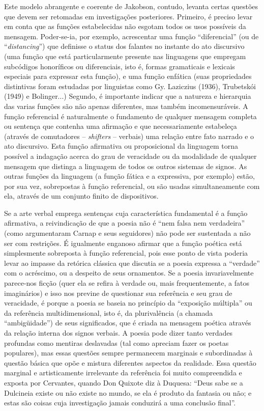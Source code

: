 Este modelo abrangente e coerente de Jakobson, contudo, levanta certas
questões que devem ser retomadas em investigações posteriores. Primeiro,
é preciso levar em conta que as funções estabelecidas não esgotam todos
os usos possíveis da mensagem. Poder-se-ia, por exemplo, acrescentar uma
função ``diferencial'' (ou de ``\emph{distancing}'') que definisse o
status dos falantes no instante do ato discursivo (uma função que está
particularmente presente nas linguagens que empregam subcódigos
honoríficos ou diferenciais, isto é, formas gramaticais e lexicais
especiais para expressar esta função), e uma função enfática (suas
propriedades distintivas foram estudadas por linguistas como Gy.
Laziczius (1936), Trubetskói (1949) e Bolinger...) Segundo, é importante
indicar que a natureza e hierarquia das varias funções são não apenas
diferentes, mas também incomensuráveis. A função referencial é
naturalmente o fundamento de qualquer mensagem completa ou sentença que
contenha uma afirmação e que necessariamente estabeleça (através de
comutadores -- \emph{shifters} -- verbais) uma relação entre fato
narrado e o ato discursivo. Esta função afirmativa ou proposicional da
linguagem torna possível a indagação acerca do grau de veracidade ou da
modalidade de qualquer mensagem que distinga a linguagem de todos os
outros sistemas de signos. As outras funções da linguagem (a função
fática e a expressiva, por exemplo) estão, por sua vez, sobrepostas à
função referencial, ou são usadas simultaneamente com ela, através de um
conjunto finito de dispositivos.

Se a arte verbal emprega sentenças cuja característica fundamental é a
função afirmativa, a reivindicação de que a poesia não é ``nem falsa nem
verdadeira'' (como argumentaram Carnap e seus seguidores) não pode ser
sustentada a não ser com restrições. É igualmente enganoso afirmar que a
função poética está simplesmente sobreposta à função referencial, pois
esse ponto de vista poderia levar ao impasse da retórica clássica que
discutia se a poesia expressa a ``verdade'' com o acréscimo, ou a
despeito de seus ornamentos. Se a poesia invariavelmente parece-nos
ficção (quer ela se refira à verdade ou, mais frequentemente, a fatos
imaginários) e isso nos previne de questionar sua referência e seu grau
de veracidade, é porque a poesia se baseia no princípio da ``exposição
múltipla'' ou da referência multidimensional, isto é, da plurivalência
(a chamada ``ambigüidade'') de seus significados, que é criada na
mensagem poética através da relação interna dos signos verbais. A poesia
pode dizer tanto verdades profundas como mentiras deslavadas (tal como
apreciam fazer os poetas populares), mas essas questões sempre
permanecem marginais e subordinadas à questão básica que opõe e mistura
diferentes aspectos da realidade. Essa questão marginal e artisticamente
irrelevante da referência foi muito compreendida e exposta por
Cervantes, quando Don Quixote diz à Duquesa: ``Deus sabe se a Dulcineia
existe ou não existe no mundo, se ela é produto da fantasia ou não; e
estas são coisas cuja investigação jamais conduzirá a uma conclusão
final''.

